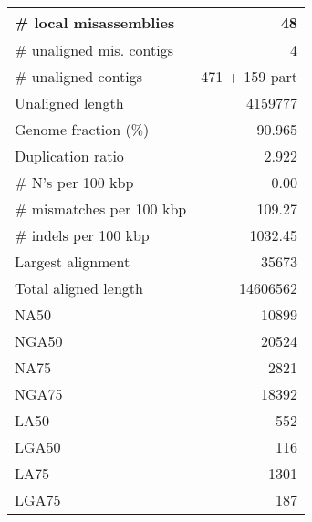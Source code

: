 \documentclass[12pt,a4paper]{article}
\begin{document}
\begin{table}[ht]
\begin{center}
\begin{tabular}{|l*{1}{|r}|}
\# local misassemblies & 48 \\ \hline
\# unaligned mis. contigs & 4 \\ \hline
\# unaligned contigs & 471 + 159 part \\ \hline
Unaligned length & 4159777 \\ \hline
Genome fraction (\%) & 90.965 \\ \hline
Duplication ratio & 2.922 \\ \hline
\# N's per 100 kbp & 0.00 \\ \hline
\# mismatches per 100 kbp & 109.27 \\ \hline
\# indels per 100 kbp & 1032.45 \\ \hline
Largest alignment & 35673 \\ \hline
Total aligned length & 14606562 \\ \hline
NA50 & 10899 \\ \hline
NGA50 & 20524 \\ \hline
NA75 & 2821 \\ \hline
NGA75 & 18392 \\ \hline
LA50 & 552 \\ \hline
LGA50 & 116 \\ \hline
LA75 & 1301 \\ \hline
LGA75 & 187 \\ \hline
\end{tabular}
\end{center}
\end{table}
\end{document}
